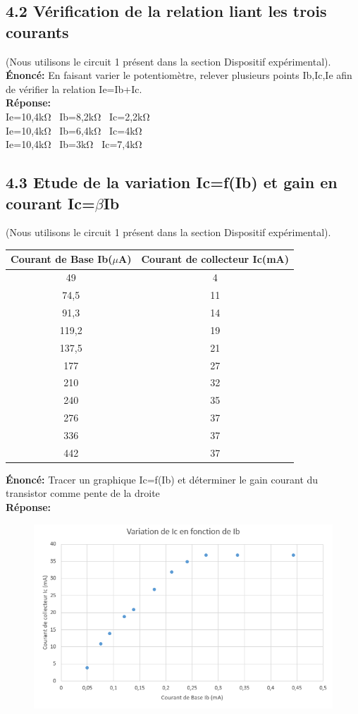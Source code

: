 \documentclass{report}
\begin{document}
\subsection*{4.2 Vérification de la relation liant les trois courants}
(Nous utilisons le circuit 1 présent dans la section Dispositif expérimental).
\textbf{\'Enonc\'e:} En faisant varier le potentiomètre, relever plusieurs points Ib,Ic,Ie afin de vérifier la relation Ie=Ib+Ic. \\

\textbf{R\'eponse:} \\
Ie=10,4k$\si{\ohm}$ \  Ib=8,2k$\si{\ohm}$ \ Ic=2,2k$\si{\ohm}$\\
Ie=10,4k$\si{\ohm}$  \ Ib=6,4k$\si{\ohm}$  \ Ic=4k$\si{\ohm}$\\
Ie=10,4k$\si{\ohm}$ \  Ib=3k$\si{\ohm}$ \  Ic=7,4k$\si{\ohm}$

\subsection*{4.3 Etude de la variation Ic=f(Ib) et gain en courant Ic=$\beta$Ib}
(Nous utilisons le circuit 1 présent dans la section Dispositif expérimental).
\begin{tabular}{|c|c|}
\hline
\textbf{Courant de Base Ib($\mu$A)} & \textbf{Courant de collecteur Ic(mA)}  \\
\hline
49 & 4  \\
\hline
74,5 & 11 \\
\hline
91,3 & 14 \\
\hline
119,2 & 19 \\
\hline
137,5 & 21 \\
\hline
177 & 27 \\
\hline
210 & 32  \\
\hline
240 & 35\\
\hline
276 & 37\\
\hline
336 & 37\\
\hline
442 & 37\\
\hline
\end{tabular}
\newpage
\textbf{\'Enonc\'e:} Tracer un graphique Ic=f(Ib) et déterminer le gain courant du transistor comme pente de la droite \\

\textbf{R\'eponse:} \\
\begin{figure}[h!]
\centering
\includegraphics[scale=0.5]{Graphe.png}
\end{figure}
\end{document}

